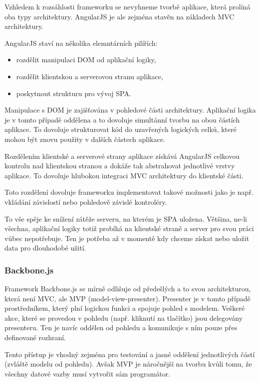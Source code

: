 Vzhledem k rozsáhlosti frameworku se nevyhneme tvorbě aplikace, která prolíná oba typy architektury. AngularJS je ale zejména stavěn na základech MVC architektury.

AngularJS staví na několika elemntárních pilířích:

\begin{itemize}
    \item rozdělit manipulaci DOM od aplikační logiky,
    \item rozdělit klientskou a serverovou stranu aplikace,
    \item poskytnout strukturu pro vývoj SPA.
\end{itemize}

Manipulace s DOM je zajišťována v pohledové části architektury. Aplikační logika je v tomto případě oddělena a to dovoluje simultánní tvorbu na obou částích aplikace. To dovoluje strukturovat kód do uzavřených logických celků, které mohou být znovu použity v dalších částech aplikace.

Rozdělením klientské a serverové strany aplikace získává AngularJS celkovou kontrolu nad klientskou stranou a dokáže tak abstrahovat jednotlivé vrstvy aplikace. To dovoluje hlubokou integraci MVC architektury do klientské části.

Toto rozdělení dovoluje frameworku implementovat takové možnosti jako je např. vkládání závislostí nebo pohledově závislé kontroléry.

To vše spěje ke snížení zátěže serveru, na kterém je SPA uložena. Většina, ne-li všechna, aplikační logiky totiž probíhá na klientské straně a server pro svou práci vůbec nepotřebuje. Ten je potřeba až v momentě kdy chceme získat nebo uložit data pro dlouhodobé užití.

\subsubsection*{Backbone.js}

Framework Backbone.js se mírně odlišuje od předešlých a to svou architekturou, která není MVC, ale MVP (model-view-presenter). Presenter je v tomto případě prostředníkem, který plní logickou funkci a spojuje pohled s modelem. Veškeré akce, které se provedou v pohledu (např. kliknutí na tlačítko) jsou delegovány presenteru. Ten je navíc oddělen od pohledu a komunikuje s ním pouze přes definované rozhraní.

Tento přístup je vhodný zejména pro testování a jasné oddělení jednotlivých částí (zvláště modelu od pohledu). Avšak MVP je náročnější na tvorbu kvůli tomu, že všechny datové vazby musí vytvořit sám programátor.

